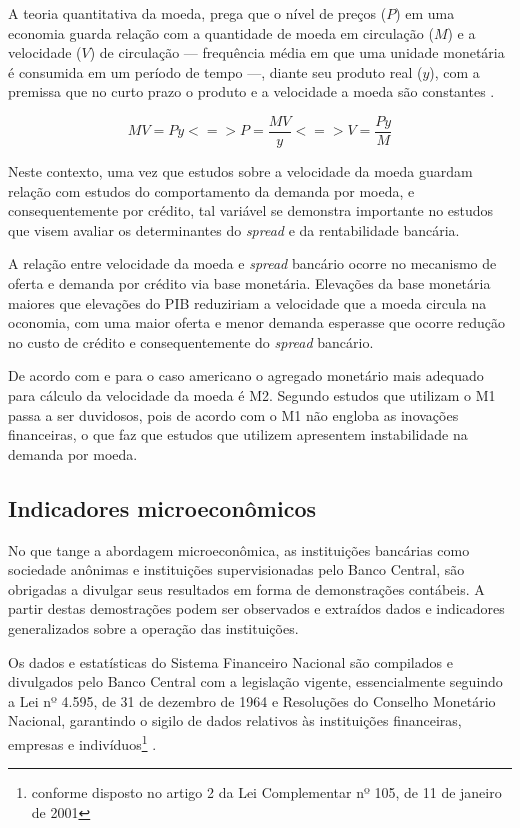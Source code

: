\documentclass[
  12pt,
  12pt,
  openright,
  oneside,
  a4paper,
  chapter=TITLE,
  section=TITLE,
  subsection=TITLE,
  subsubsection=TITLE,
  portugues,
  sumario=tradicional]{abntex2}
\begin{document}
A teoria quantitativa da moeda, prega que o nível de preços (\(P\)) em uma economia guarda relação com a quantidade de moeda em circulação (\(M\)) e a velocidade (\(V\)) de circulação --- frequência média em que uma unidade monetária é consumida em um período de tempo ---, diante seu produto real (\(y\)), com a premissa que no curto prazo o produto e a velocidade a moeda são constantes \cite{vasconcellos:2011, vieira:2016}.

\begin{equation}
MV = Py <=> P = \frac{MV}{y} <=> V = \frac{Py}{M}
\end{equation}

Neste contexto, uma vez que estudos sobre a velocidade da moeda guardam relação com estudos do comportamento da demanda por moeda, e consequentemente por crédito, tal variável se demonstra importante no estudos que visem avaliar os determinantes do \emph{spread} e da rentabilidade bancária.

A relação entre velocidade da moeda e \emph{spread} bancário ocorre no mecanismo de oferta e demanda por crédito via base monetária. Elevações da base monetária maiores que elevações do PIB reduziriam a velocidade que a moeda circula na oconomia, com uma maior oferta e menor demanda esperasse que ocorre redução no custo de crédito e consequentemente do \emph{spread} bancário.

De acordo com \textcite{bordo:1997} e \textcite{hafer:1991} para o caso americano o agregado monetário mais adequado para cálculo da velocidade da moeda é M2. Segundo \textcite{miller:1991} estudos que utilizam o M1 passa a ser duvidosos, pois de acordo com \textcite{baba:1992} o M1 não engloba as inovações financeiras, o que faz que estudos que utilizem apresentem instabilidade na demanda por moeda.

\subsection{Indicadores microeconômicos}

No que tange a abordagem microeconômica, as instituições bancárias como sociedade anônimas e instituições supervisionadas pelo Banco Central, são obrigadas a divulgar seus resultados em forma de demonstrações contábeis. A partir destas demostrações podem ser observados e extraídos dados e indicadores generalizados sobre a operação das instituições.

Os dados e estatísticas do Sistema Financeiro Nacional são compilados e divulgados pelo Banco Central com a legislação vigente, essencialmente seguindo a Lei nº 4.595, de 31 de dezembro de 1964 e Resoluções do Conselho Monetário Nacional, garantindo o sigilo de dados relativos às instituições financeiras, empresas e indivíduos\footnote{conforme disposto no artigo 2 da Lei Complementar nº 105, de 11 de janeiro de 2001} \cite{sgs:bm}.
\end{document}
